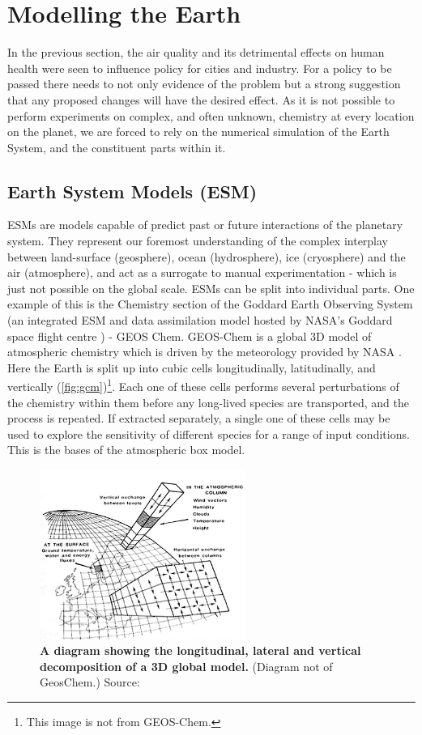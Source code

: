 
\section{Modelling the Earth}
In the previous section, the air quality and its detrimental effects on human health were seen to influence policy for cities and industry.
For a policy to be passed there needs to not only evidence of the problem but a strong suggestion that any proposed changes will have the desired effect. As it is not possible to perform experiments on complex, and often unknown, chemistry at every location on the planet, we are forced to rely on the numerical simulation of the Earth System, and the constituent parts within it.
\subsection{Earth System Models (ESM)}
  ESMs are models capable of predict past or future interactions of the planetary system. They represent our foremost understanding of the complex interplay between land-surface (geosphere), ocean (hydrosphere), ice (cryosphere) and the air (atmosphere), and act as a surrogate to manual experimentation -  which is just not possible on the global scale.
ESMs can be split into individual parts. One example of this is the Chemistry section of the Goddard Earth Observing System (an integrated ESM and data assimilation model hosted by NASA's Goddard space flight centre \citep{geosgit}) - GEOS Chem. GEOS-Chem is a global 3D model of atmospheric chemistry which is driven by the meteorology provided by NASA \citep{geos}. Here the Earth is split up into cubic cells longitudinally, latitudinally, and vertically (\autoref{fig:gcm})\footnote{This image is not from GEOS-Chem.}. Each one of these cells performs several perturbations of the chemistry within them before any long-lived species are transported, and the process is repeated. If extracted separately, a single one of these cells may be used to explore the sensitivity of different species for a range of input conditions. This is the bases of the atmospheric box model.
\begin{figure}
  \centering
  \includegraphics[width=0.6\textwidth]{gcm.jpg}
  \caption{\textbf{A diagram showing the longitudinal, lateral and vertical decomposition of a 3D global model.} (Diagram not of GeosChem.) Source: \citep{gcm}}
  \label{fig:gcm}
\end{figure}
